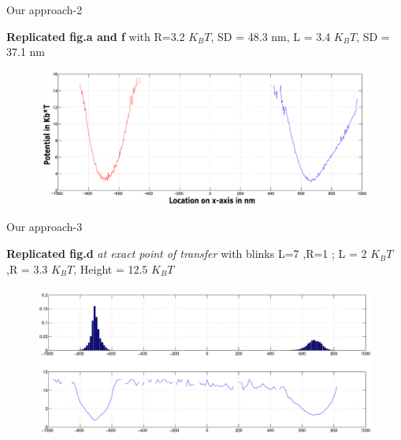 \documentclass{beamer}
\begin{document}
\begin{frame}{Our approach-2} 

\textbf{Replicated fig.a and f} with R=3.2 $K_BT$, SD = 48.3 nm, L = 3.4 $K_BT$, SD = 37.1 nm 
\begin{figure}
    \centering
    \includegraphics[height=4.5cm,width=12cm]{I4k_both_wells_700_1.eps}

\end{figure}


\end{frame}


\begin{frame}{Our approach-3} 

\textbf{Replicated fig.d} \textit{at exact point of transfer} with blinks L=7 ,R=1 ; L = 2 $K_BT$,R = 3.3 $K_BT$, Height = 12.5 $K_BT$
\begin{figure}
    \centering
    \includegraphics[height=5cm,width=12cm]{I4k_transfer_wells_6.eps}
   
\end{figure}


\end{frame}
\end{document}
